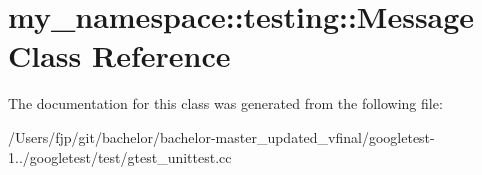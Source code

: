 \hypertarget{classmy__namespace_1_1testing_1_1_message}{}\section{my\+\_\+namespace\+:\+:testing\+:\+:Message Class Reference}
\label{classmy__namespace_1_1testing_1_1_message}


The documentation for this class was generated from the following file\+:\begin{DoxyCompactItemize}
\item 
/\+Users/fjp/git/bachelor/bachelor-\/master\+\_\+updated\+\_\+vfinal/googletest-\/1../googletest/test/gtest\+\_\+unittest.\+cc\end{DoxyCompactItemize}
